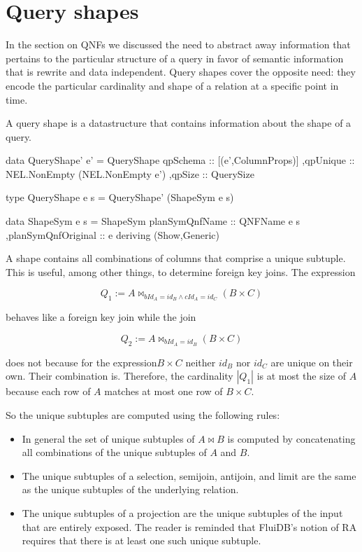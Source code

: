 \section{Query shapes}

In the section on QNFs we discussed the need to abstract away
information that pertains to the particular structure of a query in
favor of semantic information that is rewrite and data
independent. Query shapes cover the opposite need: they encode the
particular cardinality and shape of a relation at a specific point in
time.

A query shape is a datastructure that contains information about the
shape of a query.

\begin{haskellcode}
  data QueryShape' e' =
    QueryShape
    { qpSchema :: [(e',ColumnProps)]
      ,qpUnique :: NEL.NonEmpty (NEL.NonEmpty e')
      ,qpSize :: QuerySize
    }

  type QueryShape e s = QueryShape' (ShapeSym e s)

  data ShapeSym e s =
    ShapeSym { planSymQnfName :: QNFName e s
      ,planSymQnfOriginal :: e
    }
    deriving (Show,Generic)
\end{haskellcode}

A shape contains all combinations of columns that comprise a unique subtuple. 
This is useful, among other things, to determine foreign key joins. The expression

\[Q_1 := A \Join_{bId_A = id_B \land cId_A = id_C} (B \times C)\] 

behaves like a foreign key join while the join 

\[Q_2 := A \Join_{bId_A = id_B} (B \times C)\]

does not because for the expression\(B \times C\) neither \(id_B\) nor \(id_C\) are unique on their own. 
Their combination is. Therefore, the cardinality \(|Q_1|\) is at most the size of \(A\) because
each row of \(A\) matches at most one row of \(B \times C\).

So the unique subtuples are computed using the following rules:

\begin{itemize}
\item In general the set of unique subtuples of \(A \Join B\) is computed by
  concatenating all combinations of the unique subtuples of \(A\) and \(B\).
\item The unique subtuples of a selection, semijoin, antijoin, and limit are the same as the unique
  subtuples of the underlying relation.
\item The unique subtuples of a projection are the unique subtuples of the input that are entirely exposed. 
  The reader is reminded that FluiDB's notion of RA requires that there is at least one
  such unique subtuple.
\end{itemize}

